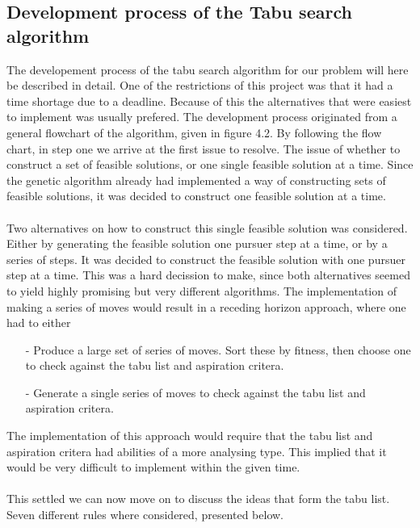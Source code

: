 \subsection{Development process of the Tabu search algorithm}
The developement process of the tabu search algorithm for our problem will here be described in detail. One of the restrictions of this project was that it had a time shortage due to a deadline. Because of this the alternatives that were easiest to implement was usually prefered. The development process originated from a general flowchart of the algorithm, given in figure 4.2. By following the flow chart, in step one we arrive at the first issue to resolve. The issue of whether to construct a set of feasible solutions, or one single feasible solution at a time. Since the genetic algorithm already had implemented a way of constructing sets of feasible solutions, it was decided to construct one feasible solution at a time.\\
\\
Two alternatives on how to construct this single feasible solution was considered. Either by generating the feasible solution one pursuer step at a time, or by a series of steps. It was decided to construct the feasible solution with one pursuer step at a time. This was a hard decission to make, since both alternatives seemed to yield highly promising but very different algorithms. The implementation of making a series of moves would result in a receding horizon approach, where one had to either  
\begin{itemize}
\item[-]{}Produce a large set of series of moves. Sort these by fitness, then choose one to check against the tabu list and aspiration critera.
\item[-]{}Generate a single series of moves to check against the tabu list and aspiration critera.
\end{itemize}
The implementation of this approach would require that the tabu list and aspiration critera had abilities of a more analysing type. This implied that it would be very difficult to implement within the given time.\\
\\This settled we can now move on to discuss the ideas that form the tabu list. Seven different rules where considered, presented below.
